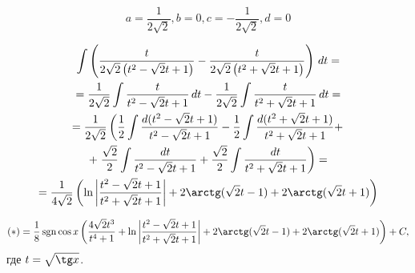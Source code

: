 \[ a = \frac{1}{2 \sqrt{2}}, b = 0, c = -\frac{1}{2 \sqrt{2}}, d = 0 \]

\begin{multline*}
    \int \left(\frac{t}{2 \sqrt{2} \left(t^2-\sqrt{2} t+1\right)}-\frac{t}{2 \sqrt{2}
        \left(t^2+\sqrt{2} t+1\right)}\right) \, dt = \\ =
        \frac{1}{2\sqrt{2}} \int \frac{t}{t^2-\sqrt{2} t+1} \, dt -
        \frac{1}{2\sqrt{2}} \int \frac{t}{t^2+\sqrt{2} t+1} \, dt = \\ =
        \frac{1}{2\sqrt{2}} \left( \frac{1}{2} \int
        \frac{d(t^2-\sqrt{2}t+1)}{t^2-\sqrt{2}t+1} - \frac{1}{2} \int
        \frac{d(t^2+\sqrt{2}t+1)}{t^2+\sqrt{2}t+1} + \right. \\ + \left. \frac{\sqrt{2}}{2} \int
        \frac{dt}{t^2-\sqrt{2}t+1} + \frac{\sqrt{2}}{2} \int
        \frac{dt}{t^2+\sqrt{2}t+1}\right) = \\ =
        \frac{1}{4\sqrt{2}}\left(\ln
        \left|\frac{t^2-\sqrt{2}t+1}{t^2+\sqrt{2}t+1}\right|+ 
        2\arctg(\sqrt{2}t-1) + 2\arctg(\sqrt{2}t+1)\right)
\end{multline*}

\HRule

\[ (*) = \frac{1}{8}\sgn \cos x \left(\frac{4 \sqrt{2} t^3}{t^4+1}+
        \ln \left|\frac{t^2-\sqrt{2}t+1}{t^2+\sqrt{2}t+1}\right|+ 
        2\arctg(\sqrt{2}t-1) + 2\arctg(\sqrt{2}t+1)\right) + C,
    \]
где $ t = \sqrt{\tg x} $.

